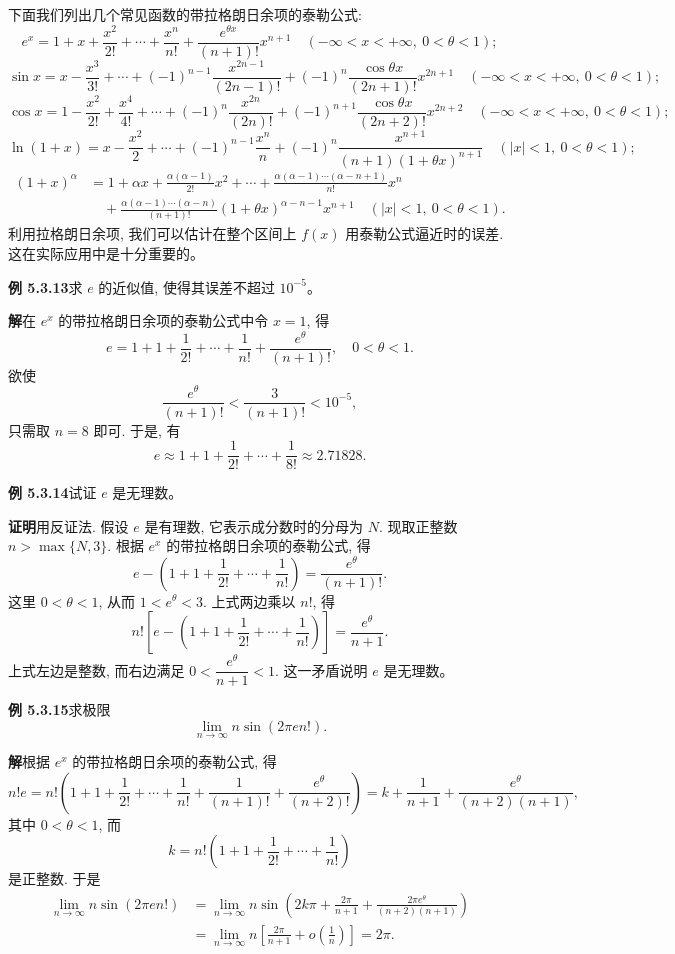 \documentclass[UTF8,12pt,a4paper,fontset=fandol]{ctexart}
\begin{document}
下面我们列出几个常见函数的带拉格朗日余项的泰勒公式:
\[
  e^x=1+x+\frac{x^2}{2!}+\cdots+\frac{x^n}{n!}+\frac{e^{\theta x}}{(n+1)!}x^{n+1}
  \quad (-\infty<x<+\infty,\ 0<\theta<1);
\]
\[
  \sin x=x-\frac{x^3}{3!}+\cdots+(-1)^{n-1}\frac{x^{2n-1}}{(2n-1)!}
  +(-1)^n\frac{\cos\theta x}{(2n+1)!}x^{2n+1}
  \quad (-\infty<x<+\infty,\ 0<\theta<1);
\]
\[
  \cos x=1-\frac{x^2}{2!}+\frac{x^4}{4!}+\cdots+(-1)^n\frac{x^{2n}}{(2n)!}
  +(-1)^{n+1}\frac{\cos\theta x}{(2n+2)!}x^{2n+2}
  \quad (-\infty<x<+\infty,\ 0<\theta<1);
\]
\[
  \ln(1+x)=x-\frac{x^2}{2}+\cdots+(-1)^{n-1}\frac{x^n}{n}
  +(-1)^n\frac{x^{n+1}}{(n+1)(1+\theta x)^{n+1}}
  \quad (|x|<1,\ 0<\theta<1);
\]
\[
\begin{aligned}
  (1+x)^\alpha
  &=
  1+\alpha x+\frac{\alpha(\alpha-1)}{2!}x^2+\cdots
  +\frac{\alpha(\alpha-1)\cdots(\alpha-n+1)}{n!}x^n \\
  &\quad+
  \frac{\alpha(\alpha-1)\cdots(\alpha-n)}{(n+1)!}(1+\theta x)^{\alpha-n-1}x^{n+1}
  \quad (|x|<1,\ 0<\theta<1).
\end{aligned}
\]
利用拉格朗日余项, 我们可以估计在整个区间上 $f(x)$ 用泰勒公式逼近时的误差. 这在实际应用中是十分重要的。

\noindent\textbf{例 5.3.13}\quad 求 $e$ 的近似值, 使得其误差不超过 $10^{-5}$。

\noindent\textbf{解}\quad 在 $e^x$ 的带拉格朗日余项的泰勒公式中令 $x=1$, 得
\[
  e=1+1+\frac1{2!}+\cdots+\frac1{n!}+\frac{e^\theta}{(n+1)!},\quad 0<\theta<1.
\]
欲使
\[
  \frac{e^\theta}{(n+1)!}<\frac3{(n+1)!}<10^{-5},
\]
只需取 $n=8$ 即可. 于是, 有
\[
  e\approx1+1+\frac1{2!}+\cdots+\frac1{8!}\approx2.71828.
\]

\noindent\textbf{例 5.3.14}\quad 试证 $e$ 是无理数。

\noindent\textbf{证明}\quad 用反证法. 假设 $e$ 是有理数, 它表示成分数时的分母为 $N$. 现取正整数 $n>\max\{N,3\}$. 根据 $e^x$ 的带拉格朗日余项的泰勒公式, 得
\[
  e-\left(1+1+\frac1{2!}+\cdots+\frac1{n!}\right)=\frac{e^\theta}{(n+1)!}.
\]
这里 $0<\theta<1$, 从而 $1<e^\theta<3$. 上式两边乘以 $n!$, 得
\[
  n!\left[e-\left(1+1+\frac1{2!}+\cdots+\frac1{n!}\right)\right]
  =
  \frac{e^\theta}{n+1}.
\]
上式左边是整数, 而右边满足 $0<\dfrac{e^\theta}{n+1}<1$. 这一矛盾说明 $e$ 是无理数。

\noindent\textbf{例 5.3.15}\quad 求极限
\[
  \lim_{n\to\infty}n\sin(2\pi en!).
\]

\noindent\textbf{解}\quad 根据 $e^x$ 的带拉格朗日余项的泰勒公式, 得
\[
  n!e
  =
  n!\left(1+1+\frac1{2!}+\cdots+\frac1{n!}+\frac1{(n+1)!}+\frac{e^\theta}{(n+2)!}\right)
  =
  k+\frac1{n+1}+\frac{e^\theta}{(n+2)(n+1)},
\]
其中 $0<\theta<1$, 而
\[
  k=n!\left(1+1+\frac1{2!}+\cdots+\frac1{n!}\right)
\]
是正整数. 于是
\[
\begin{aligned}
  \lim_{n\to\infty}n\sin(2\pi en!)
  &=
  \lim_{n\to\infty}
  n\sin\left(2k\pi+\frac{2\pi}{n+1}
  +\frac{2\pi e^\theta}{(n+2)(n+1)}\right) \\
  &=
  \lim_{n\to\infty}
  n\left[\frac{2\pi}{n+1}+o\left(\frac1n\right)\right]
  =
  2\pi.
\end{aligned}
\]
\end{document}
